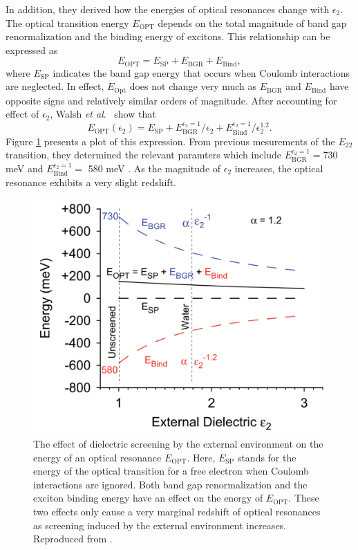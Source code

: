 In addition, they derived how the energies of optical resonances change with $\epsilon_2$. The optical transition energy $E_\text{OPT}$ depends on the total magnitude of band gap renormalization and the binding energy of excitons. This relationship can be expressed as%
%
\begin{equation}
	E_\text{OPT} = E_\text{SP} + E_\text{BGR} + E_\text{Bind},
\end{equation}
%
where $E_\text{SP}$ indicates the band gap energy that occurs when Coulomb interactions are neglected. In effect,  $E_\text{Opt}$ does not change very much as $ E_\text{BGR}$ and $E_\text{Bind}$ have opposite signs and relatively similar orders of magnitude. After accounting for effect of $\epsilon_2$, Walsh \textit{et al}.\ \cite{walsh2007screening} show that%
%
\begin{equation}
	E_\text{OPT}(\epsilon_2) = E_\text{SP} + E_\text{BGR}^{\epsilon_2 = 1}/\epsilon_2 + E_\text{Bind}^{\epsilon_2 = 1}/\epsilon_2^{1.2}.
\end{equation}
%
Figure \ref{fig:energy_shift_walsh} presents a plot of this expression. From previous mesurements of the $E_{22}$ transition, they determined the relevant paramters which include $E_\text{BGR}^{\epsilon_2 = 1} = 730$ meV and $E_\text{Bind}^{\epsilon_2 = 1} =$  580 meV \cite{walsh2007screening}. As the magnitude of $\epsilon_2$ increases, the optical resonance exhibits a very slight redshift.

\begin{figure}[ht]
	\centering
	\includegraphics[scale=0.25]{images/chapter_optical_props/dielectric_binding_walsh_2007}
	\caption{ The effect of dielectric screening by the external environment on the energy of an optical resonance $E_\text{OPT}$. Here, $E_\text{SP}$ stands for the energy of the optical transition for a free electron when Coulomb interactions are ignored. Both band gap renormalization and the exciton binding energy have an effect on the energy of $E_\text{OPT}$. These two effects only cause a very marginal redshift of optical resonances as screening induced by the external environment increases. Reproduced from \cite{walsh2008scaling}.}
	\label{fig:energy_shift_walsh}
\end{figure}

